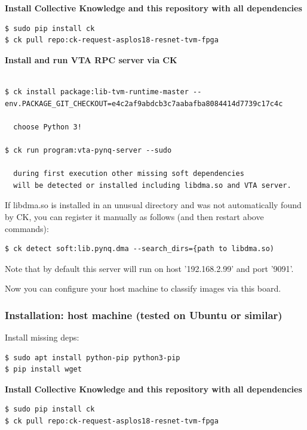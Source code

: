 \documentclass[sigconf]{acmart}
\begin{document}
\textbf{Install Collective Knowledge and this repository with all dependencies}

\begin{verbatim}
$ sudo pip install ck
$ ck pull repo:ck-request-asplos18-resnet-tvm-fpga
\end{verbatim}

\textbf{Install and run VTA RPC server via CK}

\begin{verbatim}

$ ck install package:lib-tvm-runtime-master --env.PACKAGE_GIT_CHECKOUT=e4c2af9abdcb3c7aabafba8084414d7739c17c4c

  choose Python 3!

$ ck run program:vta-pynq-server --sudo

  during first execution other missing soft dependencies 
  will be detected or installed including libdma.so and VTA server.

\end{verbatim}

If libdma.so is installed in an unusual directory and was not automatically found by CK, 
you can register it manually as follows (and then restart above commands):

\begin{verbatim}
$ ck detect soft:lib.pynq.dma --search_dirs={path to libdma.so)
\end{verbatim}

Note that by default this server will run on host '192.168.2.99' and port '9091'.

Now you can configure your host machine to classify images via this board.

\subsubsection{Installation: host machine (tested on Ubuntu or similar)}

Install missing deps:

\begin{verbatim}
$ sudo apt install python-pip python3-pip
$ pip install wget
\end{verbatim}

\textbf{Install Collective Knowledge and this repository with all dependencies}

\begin{verbatim}
$ sudo pip install ck
$ ck pull repo:ck-request-asplos18-resnet-tvm-fpga
\end{verbatim}
\end{document}
